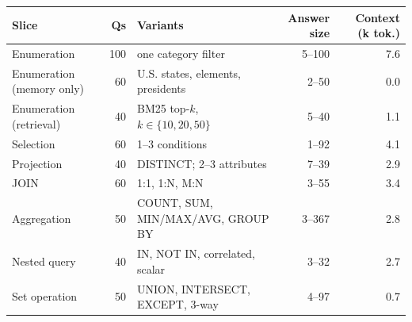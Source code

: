 \begin{tabular}{lrlrr}
\toprule
Slice & Qs & Variants & Answer size & Context (k tok.) \\
\midrule
Enumeration & 100 & one category filter & 5--100 & 7.6 \\
Enumeration (memory only) & 60 & U.S. states, elements, presidents & 2--50 & 0.0 \\
Enumeration (retrieval) & 40 & BM25 top-$k$, $k\in\{10,20,50\}$ & 5--40 & 1.1 \\
\midrule
Selection & 60 & 1--3 conditions & 1--92 & 4.1 \\
Projection & 40 & DISTINCT; 2--3 attributes & 7--39 & 2.9 \\
JOIN & 60 & 1:1, 1:N, M:N & 3--55 & 3.4 \\
Aggregation & 50 & COUNT, SUM, MIN/MAX/AVG, GROUP BY & 3--367 & 2.8 \\
Nested query & 40 & IN, NOT IN, correlated, scalar & 3--32 & 2.7 \\
Set operation & 50 & UNION, INTERSECT, EXCEPT, 3-way & 4--97 & 0.7 \\
\bottomrule
\end{tabular}
